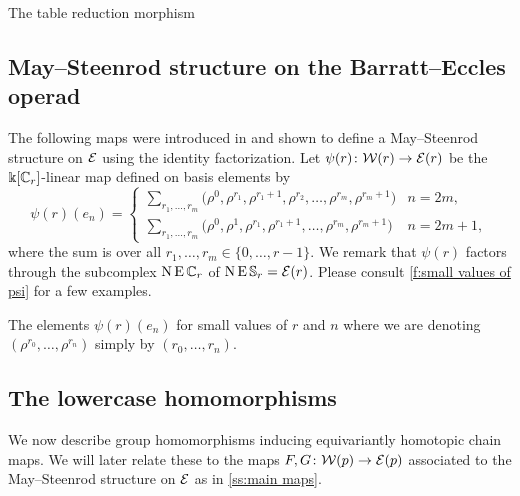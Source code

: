 \sssec

The table reduction morphism \TBW

\subsection{May--Steenrod structure on the Barratt--Eccles operad}

The following maps were introduced in \cite{medina2021may_st} and shown to define a May--Steenrod structure on $\mathcal{E}$ using the identity factorization.
Let $\psi(r) \colon \mathcal{W}(r) \to \mathcal{E}(r)$ be the $\Bbbk[\mathbb{C}_r]$-linear map defined on basis elements by
\begin{equation*}
	\psi(r)(e_{n}) = \begin{cases}
		\displaystyle{\sum_{r_1, \dots, r_m}} \big(\rho^0, \rho^{r_1}, \rho^{r_1+1}, \rho^{r_2}, \dots, \rho^{r_{m}}, \rho^{r_{m}+1} \big) & n = 2m, \\
		\displaystyle{\sum_{r_1, \dots, r_m}} \big(\rho^0, \rho^1, \rho^{r_1}, \rho^{r_1+1}, \dots, \rho^{r_{m}}, \rho^{r_{m}+1} \big) & n = 2m+1,
	\end{cases}
\end{equation*}
where the sum is over all $r_1, \dots, r_m \in \{0, \dots, r-1\}$.
We remark that $\psi(r)$ factors through the subcomplex $\operatorname{N}\operatorname{E}\mathbb{C}_r$ of $\operatorname{N}\operatorname{E}\mathbb{S}_r = \mathcal{E}(r)$.
Please consult \cref{f:small values of psi} for a few examples.

\begin{table}
	\centering
	
	\caption{The elements $\psi(r)(e_n)$ for small values of $r$ and $n$ where we are denoting $(\rho^{r_0}, \dots, \rho^{r_n})$ simply by $(r_0, \dots, r_n)$.}
	\label{f:small values of psi}
\end{table}

\subsection{The lowercase homomorphisms}

We now describe group homomorphisms inducing equivariantly homotopic chain maps.
We will later relate these to the maps $F,G \colon \mathcal{W}(p) \to \mathcal{E}(p)$ associated to the May--Steenrod structure on $\mathcal{E}$ as in \cref{ss:main maps}.

\sssec

